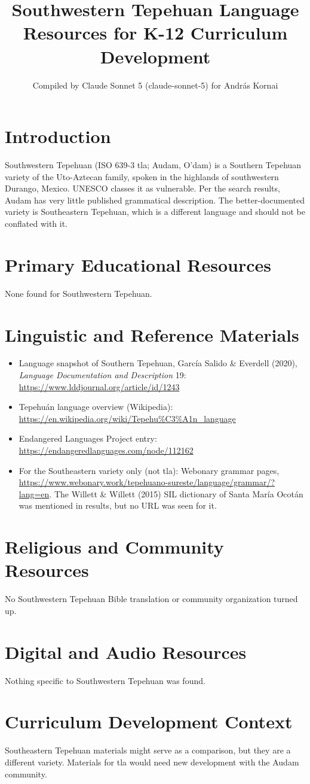 \documentclass[12pt]{article}
\title{Southwestern Tepehuan Language Resources for K-12 Curriculum Development}
\author{Compiled by Claude Sonnet 5 (claude-sonnet-5) for Andr\'as Kornai}
\date{}
\begin{document}
\maketitle

\section{Introduction}
Southwestern Tepehuan (ISO 639-3 tla; Audam, O'dam) is a Southern Tepehuan variety of the Uto-Aztecan family, spoken in the highlands of southwestern Durango, Mexico. UNESCO classes it as vulnerable. Per the search results, Audam has very little published grammatical description. The better-documented variety is Southeastern Tepehuan, which is a different language and should not be conflated with it.

\section{Primary Educational Resources}
None found for Southwestern Tepehuan.

\section{Linguistic and Reference Materials}
\begin{itemize}
\item Language snapshot of Southern Tepehuan, Garc\'ia Salido \& Everdell (2020), \emph{Language Documentation and Description} 19: \url{https://www.lddjournal.org/article/id/1243}
\item Tepehu\'an language overview (Wikipedia): \url{https://en.wikipedia.org/wiki/Tepehu%C3%A1n_language}
\item Endangered Languages Project entry: \url{https://endangeredlanguages.com/node/112162}
\item For the Southeastern variety only (not tla): Webonary grammar pages, \url{https://www.webonary.work/tepehuano-sureste/language/grammar/?lang=en}. The Willett \& Willett (2015) SIL dictionary of Santa Mar\'ia Ocotán was mentioned in results, but no URL was seen for it.
\end{itemize}

\section{Religious and Community Resources}
No Southwestern Tepehuan Bible translation or community organization turned up.

\section{Digital and Audio Resources}
Nothing specific to Southwestern Tepehuan was found.

\section{Curriculum Development Context}
Southeastern Tepehuan materials might serve as a comparison, but they are a different variety. Materials for tla would need new development with the Audam community.
\end{document}
